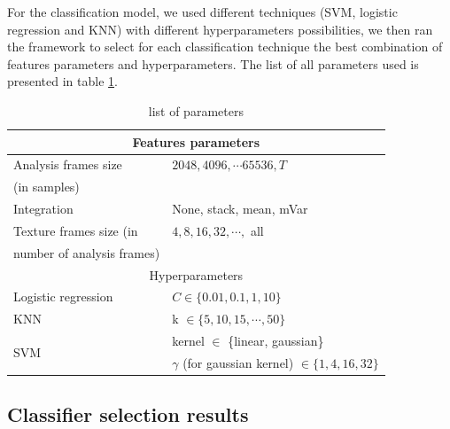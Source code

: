 \documentclass[10pt, conference, compsocconf]{IEEEtran}
\begin{document}
For the classification model, we used different techniques (SVM, logistic regression and KNN) with different hyperparameters possibilities, we then ran the framework to select for each classification technique the best combination of features parameters and hyperparameters. The list of all parameters used is presented in table \ref{table:params}.

\begin{table}[h]
  \centering
  \begin{tabular}{|l|l|}
    \hline
    \multicolumn{2}{|c|}{Features parameters}                                               \\
      \hline
      Analysis frames size     & $2048, 4096, \cdots 65536, T$                              \\
      (in samples)             &                                                            \\
     \hline
     Integration               & None, stack, mean, mVar                                    \\
    \hline
    Texture frames size (in    & $4,8,16,32, \cdots,$ all                                   \\
    number of analysis frames) &                                                            \\
    \hline
    \hline
    \multicolumn{2}{|c|}{Hyperparameters}                                                   \\
     \hline
    Logistic regression        & $C \in \{0.01,0.1,1,10\}$                                  \\
    \hline
    KNN                        & k $\in \{5,10,15,\cdots,50\}$                              \\ 
    \hline
    \multirow{3}{*}{SVM}
                               & kernel $\in$ \{linear, gaussian\}                          \\
                               & $\gamma$ (for gaussian kernel) $\in \{1, 4, 16, 32\}$ \\       
  \hline

  \end{tabular}
\caption{list of parameters \label{table:params}}
\end{table}
\subsection{Classifier selection results}
\end{document}
